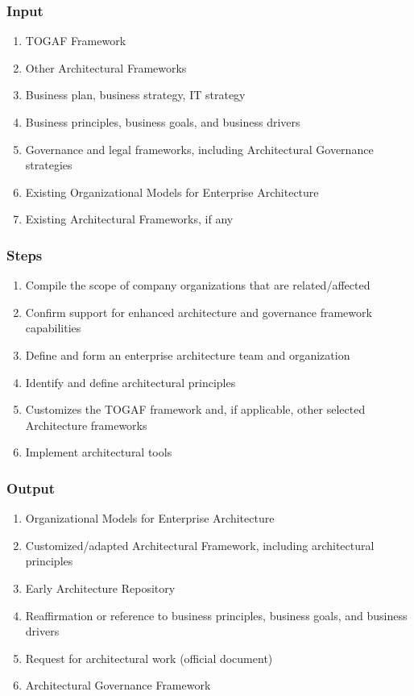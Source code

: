 \documentclass[aspectratio=169, table]{beamer}
\begin{document}
    \begin{frame}
        \frametitle{Input}
        \begin{enumerate}
            \item TOGAF Framework
            \item Other Architectural Frameworks
            \item Business plan, business strategy, IT strategy
            \item Business principles, business goals, and business drivers
            \item Governance and legal frameworks, including Architectural Governance strategies
            \item Existing Organizational Models for Enterprise Architecture
            \item Existing Architectural Frameworks, if any
        \end{enumerate}
    \end{frame}

    \begin{frame}
        \frametitle{Steps}
        \begin{enumerate}
            \item Compile the scope of company organizations that are related/affected
            \item Confirm support for enhanced architecture and governance framework capabilities
            \item Define and form an enterprise architecture team and organization
            \item Identify and define architectural principles
            \item Customizes the TOGAF framework and, if applicable, other selected Architecture frameworks
            \item Implement architectural tools
        \end{enumerate}
    \end{frame}

    \begin{frame}
        \frametitle{Output}
        \begin{enumerate}
            \item Organizational Models for Enterprise Architecture
            \item Customized/adapted Architectural Framework, including architectural principles
            \item Early Architecture Repository
            \item Reaffirmation or reference to business principles, business goals, and business drivers
            \item Request for architectural work (official document)
            \item Architectural Governance Framework
        \end{enumerate}
    \end{frame}
\end{document}
